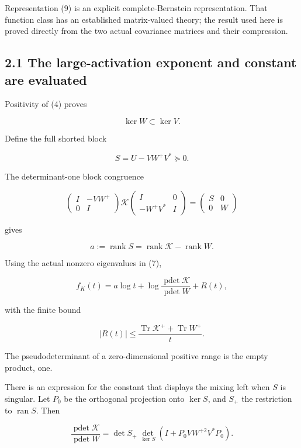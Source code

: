\documentclass[11pt]{article}
\begin{document}
Representation (9) is an explicit complete-Bernstein representation. That function class has an established matrix-valued theory; the result used here is proved directly from the two actual covariance matrices and their compression.

\subsection{2.1 The large-activation exponent and constant are evaluated}\label{the-large-activation-exponent-and-constant-are-evaluated}

Positivity of (4) proves

\[
\ker W\subset\ker V.
\]

Define the full shorted block

\[
S=U-VW^+V^*\succeq0.
\tag{11}
\]

The determinant-one block congruence

\[
\begin{pmatrix}I&-VW^+\\0&I\end{pmatrix}
\mathcal K
\begin{pmatrix}I&0\\-W^+V^*&I\end{pmatrix}
=
\begin{pmatrix}S&0\\0&W\end{pmatrix}
\]

gives

\[
a:=\operatorname{rank}S
=\operatorname{rank}\mathcal K-\operatorname{rank}W.
\]

Using the actual nonzero eigenvalues in (7),

\[
\boxed{
f_K(t)
=
a\log t+
\log\frac{\operatorname{pdet}\mathcal K}
{\operatorname{pdet}W}
+R(t),
}
\tag{12}
\]

with the finite bound

\[
\boxed{
|R(t)|
\le
\frac{\operatorname{Tr}\mathcal K^+
+\operatorname{Tr}W^+}{t}.
}
\tag{13}
\]

The pseudodeterminant of a zero-dimensional positive range is the empty product, one.

There is an expression for the constant that displays the mixing left when \(S\) is singular. Let \(P_0\) be the orthogonal projection onto \(\ker S\), and \(S_+\) the restriction to \(\operatorname{ran}S\). Then

\[
\boxed{
\frac{\operatorname{pdet}\mathcal K}{\operatorname{pdet}W}
=
\det S_+\,
\det_{\ker S}\!\left(
I+P_0VW^{+2}V^*P_0
\right).
}
\tag{14}
\]
\end{document}
